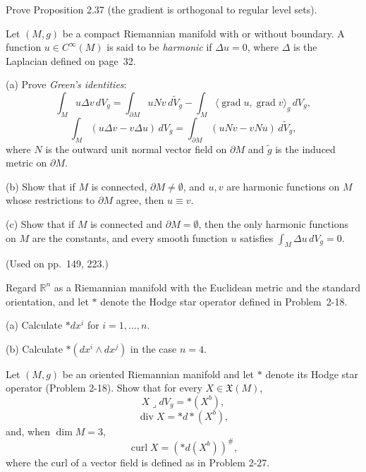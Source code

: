\begin{exercise}\label{prob:gradient-orthogonal-level-sets}


Prove Proposition 2.37 (the gradient is orthogonal to regular level sets).
\end{exercise}

\begin{exercise}\label{prob:harmonic-functions}
Let $(M,g)$ be a compact Riemannian manifold with or without boundary.
A function $u \in C^\infty(M)$ is said to be \emph{harmonic} if $\Delta u = 0$, where $\Delta$ is the
Laplacian defined on page~32.

(a) Prove \emph{Green's identities}:
\[
\int_M u\Delta v \, dV_g = \int_{\partial M} u N v \, d\tilde{V}_g - \int_M \langle \operatorname{grad} u, \operatorname{grad} v \rangle_g \, dV_g,
\]
\[
\int_M (u\Delta v - v\Delta u) \, dV_g = \int_{\partial M} (u N v - v N u) \, d\tilde{V}_g,
\]
where $N$ is the outward unit normal vector field on $\partial M$ and $\tilde{g}$ is the
induced metric on $\partial M$.

(b) Show that if $M$ is connected, $\partial M \ne \emptyset$, and $u, v$ are harmonic functions
on $M$ whose restrictions to $\partial M$ agree, then $u \equiv v$.

(c) Show that if $M$ is connected and $\partial M = \emptyset$, then the only harmonic
functions on $M$ are the constants, and every smooth function $u$ satisfies
$\int_M \Delta u \, dV_g = 0$.

(Used on pp.\ 149, 223.)
\end{exercise}

\begin{exercise}\label{prob:hodge-star-euclidean}


Regard $\mathbb{R}^n$ as a Riemannian manifold with the Euclidean metric and the standard orientation, and let $*$ denote the Hodge star operator defined in Problem~2-18.

(a) Calculate $* dx^i$ for $i = 1, \ldots, n$.

(b) Calculate $*(dx^i \wedge dx^j)$ in the case $n = 4$.
\end{exercise}

\begin{exercise}
\label{prob:hodge-star-exterior-derivative}
Let $(M,g)$ be an oriented Riemannian manifold and let $*$ denote its Hodge star operator (Problem 2-18). Show that for every $X \in \mathfrak{X}(M)$,
\[
X \mathbin{\lrcorner} dV_g = *(X^b),
\]
\[
\operatorname{div} X = *d*(X^b),
\]
and, when $\dim M = 3$,
\[
\operatorname{curl} X = (*d(X^b))^{\#},
\]
where the curl of a vector field is defined as in Problem 2-27.
\end{exercise}

